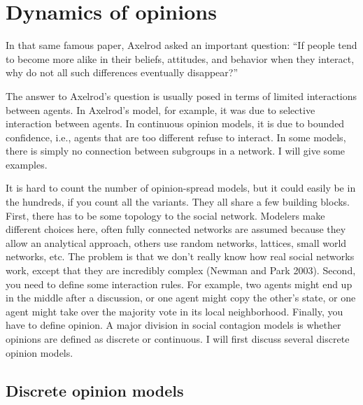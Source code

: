 \documentclass[
  letterpaper,
]{scrbook}
\begin{document}
\hypertarget{dynamics-of-opinions}{%
\section{Dynamics of opinions}\label{dynamics-of-opinions}}

In that same famous paper, Axelrod asked an important question: ``If
people tend to become more alike in their beliefs, attitudes, and
behavior when they interact, why do not all such differences eventually
disappear?''

The answer to Axelrod's question is usually posed in terms of limited
interactions between agents. In Axelrod's model, for example, it was due
to selective interaction between agents. In continuous opinion models,
it is due to bounded confidence, i.e., agents that are too different
refuse to interact. In some models, there is simply no connection
between subgroups in a network. I will give some examples.

It is hard to count the number of opinion-spread models, but it could
easily be in the hundreds, if you count all the variants. They all share
a few building blocks. First, there has to be some topology to the
social network. Modelers make different choices here, often fully
connected networks are assumed because they allow an analytical
approach, others use random networks, lattices, small world networks,
etc. The problem is that we don't really know how real social networks
work, except that they are incredibly complex (Newman and Park 2003).
Second, you need to define some interaction rules. For example, two
agents might end up in the middle after a discussion, or one agent might
copy the other's state, or one agent might take over the majority vote
in its local neighborhood. Finally, you have to define opinion. A major
division in social contagion models is whether opinions are defined as
discrete or continuous. I will first discuss several discrete opinion
models.

\hypertarget{discrete-opinion-models}{%
\subsection{Discrete opinion models}\label{discrete-opinion-models}}

\hypertarget{section}{%
\subsection*{}\label{section}}
\end{document}
